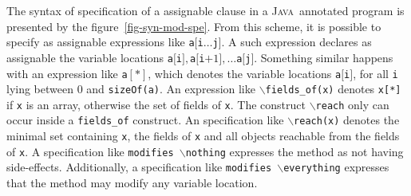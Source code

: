 \documentclass[a4paper]{llncs}
\newcommand{\java}{\textsc{Java}}
\begin{document}
The syntax of specification of a assignable clause in a
\java~annotated program
is presented by the figure~\ref{fig-syn-mod-spe}. From this scheme, it
is possible to specify as assignable expressions like
\texttt{a$[$i$\dots$j$]$}. A such expression declares as assignable
the variable locations
\texttt{a$[$i$],$a$[$i$+1],\dots$a$[$j$]$}. Something similar happens
with an expression like
\texttt{a$[*]$}, which denotes the variable locations
\texttt{a$[$i$]$}, for all \texttt{i} lying between $0$ and
\texttt{sizeOf(a)}. An expression like
\texttt{$\backslash$fields\_of(x)} denotes \texttt{x[*]} if \texttt{x}
is an array, otherwise the set of fields of \texttt{x}. The construct
\texttt{$\backslash$reach} only can occur inside a \texttt{fields\_of}
construct. An specification like \texttt{$\backslash$reach(x)} denotes
the minimal set containing \texttt{x}, the fields of \texttt{x} and
all objects
reachable from the fields of \texttt{x}. A specification like
\texttt{modifies \!\!$\backslash$nothing} expresses the method as not
having
side-effects. Additionally, a specification like \texttt{modifies
\!\!$\backslash$everything} expresses that the method may modify any
variable location.
\end{document}
